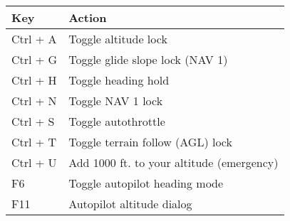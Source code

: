 \begin{tabular}{|l|l|}\hline
 Key              &         Action\\\hline
    Ctrl + A      &         Toggle altitude lock \index{altitude hold}\\
    Ctrl + G      &         Toggle glide slope lock (NAV 1)\\
    Ctrl + H      &         Toggle heading hold\index{heading hold}\\
    Ctrl + N      &         Toggle NAV 1 lock\\
    Ctrl + S      &         Toggle autothrottle\index{autothrottle}\\
    Ctrl + T      &         Toggle terrain follow (AGL) lock\\
    Ctrl + U      &         Add 1000 ft. to your altitude (emergency)\\
    F6            &         Toggle autopilot heading mode\\
    F11           &         Autopilot altitude dialog\\\hline
\end{tabular}

